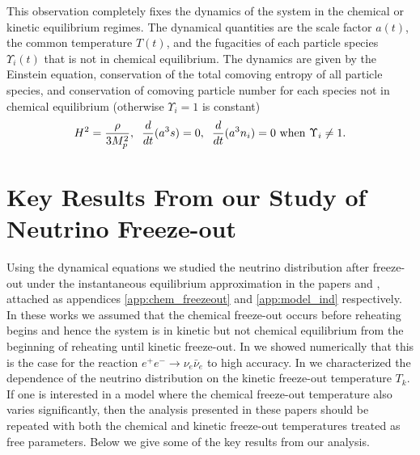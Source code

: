 This observation completely fixes the dynamics of the system in the chemical or kinetic equilibrium regimes.  The dynamical quantities are the scale factor $a(t)$, the common temperature $T(t)$, and the fugacities of each particle species $\Upsilon_i(t)$ that is not in chemical equilibrium.  The dynamics are given by the Einstein equation, conservation of the total comoving entropy of all particle species, and conservation of comoving particle number for each species not in chemical equilibrium (otherwise $\Upsilon_i=1$ is constant)
\begin{equation}\label{eq_dynamics}
H^2=\frac{\rho}{3M_p^2}, \hspace{2mm} \frac{d}{dt}(a^3s)=0,\hspace{2mm} \frac{d}{dt}(a^3n_i)=0 \text{ when } \Upsilon_i\neq 1.
\end{equation}

\section{Key Results From our Study of Neutrino Freeze-out}\label{nu_freezeout_summary}
Using the dynamical equations  we studied the neutrino distribution after freeze-out under the instantaneous equilibrium approximation in the papers \cite{Birrell2013} and \cite{Birrell:2013_2}, attached as appendices \ref{app:chem_freezeout} and \ref{app:model_ind} respectively.  In these works we assumed that the chemical freeze-out occurs before reheating begins and hence the system is in kinetic but not chemical equilibrium from the beginning of reheating until kinetic freeze-out.  In \cite{Birrell2013} we showed numerically that this is the case for the reaction $e^+e^-\rightarrow \nu_e\bar\nu_e$ to high accuracy.  In  \cite{Birrell:2013_2} we characterized the dependence of the neutrino distribution on the kinetic freeze-out temperature $T_k$.  If one is interested in a model where the chemical freeze-out temperature also varies significantly, then the analysis presented in these papers should be repeated with both the chemical and kinetic freeze-out temperatures treated as free parameters. Below we give some of the key results from our analysis.



